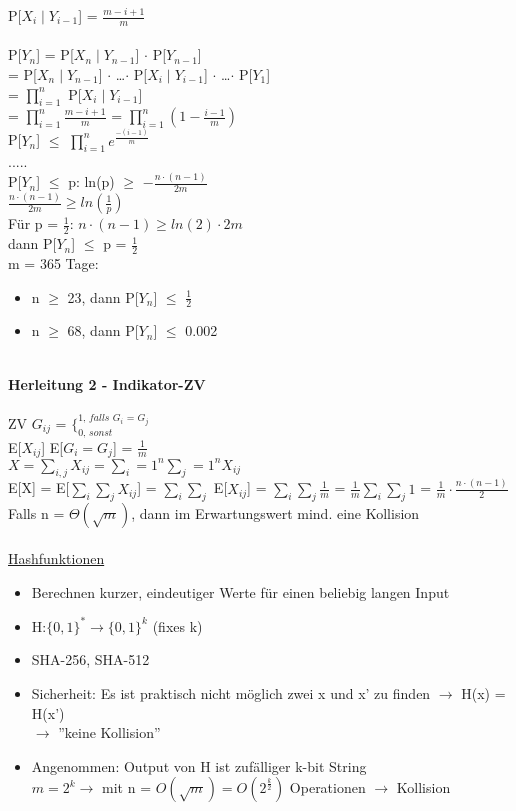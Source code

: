 \documentclass{article}
\begin{document}
 	P[$X_i \mid Y_{i-1}$] = $\frac{m-i+1}{m}$ \\
 	\\
 	P[$Y_n$] = P[$X_n \mid Y_{n-1}$] $\cdot$ P[$Y_{n-1}$] \\
 	= P[$X_n \mid Y_{n-1}$] $\cdot$ \ldots $\cdot$ P[$X_i \mid Y_{i-1}$] $\cdot$ \ldots $\cdot$ P[$Y_1$] \\
 	= $\prod_{i=1}^{n}$ P[$X_i \mid Y_{i-1}$] \\
 	= $\prod_{i=1}^{n} \frac{m-i+1}{m}$ = $\prod_{i=1}^{n} \left(1-\frac{i-1}{m}\right)$ \\
 	P[$Y_n$] $\leq$ $\prod_{i=1}^{n} e^{\frac{-(i-1)}{m}}$ \\
 	..... \\
 	P[$Y_n$] $\leq$ p: ln(p) $\geq$ $-\frac{n \cdot (n-1)}{2m}$ \\
 	$\frac{n \cdot (n-1)}{2m} \geq ln(\frac{1}{p})$ \\
 	Für p = $\frac{1}{2}$: $n \cdot (n-1) \geq ln(2) \cdot 2m$ \\
 	dann P[$Y_n$] $\leq$ p = $\frac{1}{2}$ \\
 	m = 365 Tage: 
 	\begin{itemize}
 		\item n $\geq$ 23, dann P[$Y_n$] $\leq$ $\frac{1}{2}$
 		\item n $\geq$ 68, dann P[$Y_n$] $\leq$ 0.002
 	\end{itemize}
 	\newpage
 	\hfill \\
 	\textbf{Herleitung 2 - Indikator-ZV} \\
 	\\
 	ZV $G_{ij}$ = $\lbrace^{\textit{1, falls $G_i$ = $G_j$}}_{\textit{0, sonst}}$ \\
 	E[$X_{ij}$] E[$G_i = G_j$] = $\frac{1}{m}$ \\
 	$X = \sum_{i,j} X_{ij} = \sum_i=1^n \sum_j=1^n X_{ij}$ \\
 	E[X] = E[$\sum_{i} \sum_{j} X_{ij}$] = $\sum_{i} \sum_{j}$ E[$X_{ij}$] = $\sum_{i} \sum_{j} \frac{1}{m}$ = $\frac{1}{m} \sum_{i} \sum_{j} 1$ = $\frac{1}{m} \cdot \frac{n \cdot (n-1)}{2}$ \\
 	Falls n = $\Theta(\sqrt{m})$, dann im Erwartungswert mind. eine Kollision \\
 	\\
 	\underline{Hashfunktionen}
 	\begin{itemize}
 		\item Berechnen kurzer, eindeutiger Werte für einen beliebig langen Input
 		\item H:$\{0,1\}^{*} \rightarrow \{0,1\}^k$ (fixes k)
 		\item SHA-256, SHA-512
 		\item Sicherheit: Es ist praktisch nicht möglich zwei x und x' zu finden $\rightarrow$ H(x) = H(x') \\
 		$\rightarrow$ ''keine Kollision''
 		\item Angenommen: Output von H ist zufälliger k-bit String \\
 		$m=2^k \rightarrow$ mit n = $O(\sqrt{m}) = O(2^{\frac{k}{2}})$ Operationen $\rightarrow$ Kollision \\
 	\end{itemize}
\end{document}
